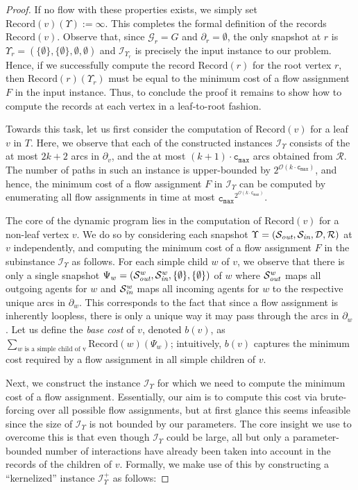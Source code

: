 \documentclass[letterpaper]{article} %
\newcommand{\bigoh}{\ensuremath{{\mathcal O}}}
\newcommand{\cmax}{\mathtt{c_{max}}}
\newcommand{\forgottenG}{\mathcal{G}}
\newcommand{\Rec}{\text{Record}}
\renewcommand{\R}{\mathcal{R}}
\renewcommand{\D}{\mathcal{D}}
\newcommand{\Sout}{\mathcal{S}_\emph{out}}
\newcommand{\Sin}{\mathcal{S}_\emph{in}}
\begin{document}
\begin{proof}
If no flow with these properties exists, we simply set $\Rec(v)(\Upsilon):=\infty$. This completes the formal definition of the records $\Rec(v)$. Observe that, since $\forgottenG_r=G$ and $\partial_r=\emptyset$, the only snapshot at $r$ is $\Upsilon_r=(\{\emptyset\},\{\emptyset\},\emptyset,\emptyset)$ and $\mathcal{I}_{\Upsilon_r}$ is precisely the input instance to our problem. Hence, if we successfully compute the record $\Rec(r)$ for the root vertex $r$, then $\Rec(r)(\Upsilon_r)$ must be equal to the minimum cost of a flow assignment $F$ in the input instance. Thus, to conclude the proof it remains to show how to compute the records at each vertex in a leaf-to-root fashion. 

Towards this task, let us first consider the computation of $\Rec(v)$ for a leaf $v$ in $T$. Here, we observe that each of the constructed instances $\mathcal{I}_\Upsilon$ consists of the at most $2k+2$ arcs in $\partial_v$, and the at most $(k+1)\cdot \cmax$ arcs obtained from $\R$. The number of paths in such an instance is upper-bounded by $2^{\bigoh(k\cdot \cmax)}$, and hence, the minimum cost of a flow assignment $F$ in $\mathcal{I}_\Upsilon$ can be computed by enumerating all flow assignments in time at most $\cmax^{2^{\bigoh(k\cdot \cmax)}}$.

The core of the dynamic program lies in the computation of $\Rec(v)$ for a non-leaf vertex $v$. We do so by considering each snapshot $\Upsilon=(\Sout,\Sin,\D,\R)$ at $v$ independently, and computing the minimum cost of a flow assignment $F$ in the subinstance $\mathcal{I}_\Upsilon$ as follows. For each simple child $w$ of $v$, we observe that there is only a single snapshot $\Psi_w=(\Sout^w,\Sin^w,\{\emptyset\},\{\emptyset\})$ of $w$ where $\Sout^w$ maps all outgoing agents for $w$ and $\Sin^w$ maps all incoming agents for $w$ to the respective unique arcs in $\partial_w$. This corresponds to the fact that since a flow assignment is inherently loopless, there is only a unique way it may pass through the arcs in $\partial_w$. Let us define the \emph{base cost} of $v$, denoted $b(v)$, as $\sum_{w\text{ is a simple child of v}}\Rec(w)(\Psi_w)$; intuitively, $b(v)$ captures the minimum cost required by a flow assignment in all simple children of $v$. 

Next, we construct the instance $\mathcal{I}_\Upsilon$ for which we need to compute the minimum cost of a flow assignment. Essentially, our aim is to compute this cost via brute-forcing over all possible flow assignments, but at first glance this seems infeasible since the size of $\mathcal{I}_\Upsilon$ is not bounded by our parameters. The core insight we use to overcome this is that even though $\mathcal{I}_\Upsilon$ could be large, all but only a parameter-bounded number of interactions have already been taken into account in the records of the children of $v$.
Formally, we make use of this by constructing a ``kernelized'' instance $\mathcal{I}^+_\Upsilon$ as follows:


\end{proof}
\end{document}
